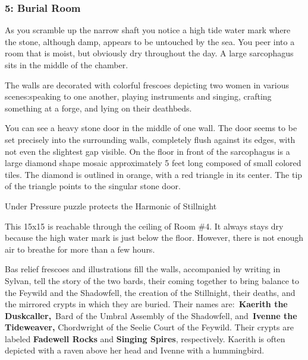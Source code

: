 \documentclass[10pt,twocolumn]{article}
\let\oldtextbf\textbf
\renewcommand{\textbf}[1]{\oldtextbf{{#1}}}
\renewenvironment{quote}
  {%
    \begingroup
      \setlength{\parindent}{1em}%
      \setlength{\parskip}{0pt}%
      \begin{tcolorbox}[myquote,
        before upper={%
          \let\textbf\oldtextbf
          \setlength{\parindent}{1.5em}%
          \setlength{\parskip}{0pt}%
          \noindent              %
        }%
      ]%
  }
  {%
      \end{tcolorbox}%
    \endgroup
  }
\begin{document}
\subsubsection{5: Burial Room}\label{burial-room}

\begin{quote}
As you scramble up the narrow shaft you notice a high tide water mark
where the stone, although damp, appears to be untouched by the sea. You
peer into a room that is moist, but obviously dry throughout the day. A
large sarcophagus sits in the middle of the chamber.

The walls are decorated with colorful frescoes depicting two women in
various scenes:speaking to one another, playing instruments and singing,
crafting something at a forge, and lying on their deathbeds.

You can see a heavy stone door in the middle of one wall. The door seems
to be set precisely into the surrounding walls, completely flush against
its edges, with not even the slightest gap visible. On the floor in
front of the sarcophagus is a large diamond shape mosaic approximately 5
feet long composed of small colored tiles. The diamond is outlined in
orange, with a red triangle in its center. The tip of the triangle
points to the singular stone door.~
\end{quote}

\begin{tcolorbox}[
  enhanced,
  breakable,
  colback={encountercolor},
  colframe=black,
  boxrule=1pt,
  coltext=black,
  arc=6pt,
  left=4pt,
  right=4pt,
  top=2pt,
  bottom=2pt,
  boxsep=4pt,
  before skip=10pt,
  after skip=10pt,
  fontupper={\blockquoteFont\small\linespread{0.9}\selectfont\color{black}}
]

\faSkull\hspace{0.8em}\begin{minipage}[t]{\dimexpr\linewidth-1.8em\hangindent=1.8em\hangafter=0}Under
Pressure puzzle protects the Harmonic of Stillnight

\end{minipage}\end{tcolorbox}

This 15x15 is reachable through the ceiling of Room \#4. It always stays
dry because the high water mark is just below the floor. However, there
is not enough air to breathe for more than a few hours.

Bas relief frescoes and illustrations fill the walls, accompanied by
writing in Sylvan, tell the story of the two bards, their coming
together to bring balance to the Feywild and the Shadowfell, the
creation of the Stillnight, their deaths, and the mirrored crypts in
which they are buried. Their names are:~\textbf{Kaerith the
Duskcaller,}~Bard of the Umbral Assembly of the Shadowfell,
and~\textbf{Ivenne the Tideweaver,} Chordwright of the Seelie Court of
the Feywild. Their crypts are labeled \textbf{Fadewell Rocks} and
\textbf{Singing Spires}, respectively. Kaerith is often depicted with a
raven above her head and Ivenne with a hummingbird.
\end{document}
